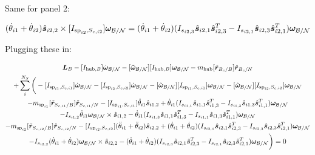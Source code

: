 \documentclass[paper]{aiaaNew}
\begin{document}
Same for panel 2:

\begin{equation}
(\dot{\theta}_{i1}  + \dot{\theta}_{i2})\hat{\bm s}_{i2,2} \times [I_{\text{sp}_{i2},S_{c,i2}}] \bm \omega_{\cal{B/N}} = (\dot{\theta}_{i1}  + \dot{\theta}_{i2}) (I_{s_{i2,3}} \hat{\bm s}_{i2,1} \hat{\bm s}_{i2,3}^T - I_{s_{i2,1}} \hat{\bm s}_{i2,3} \hat{\bm s}_{i2,1}^T) \bm \omega_{\cal{B/N}}
\end{equation}

Plugging these in:

\begin{multline}
\bm L_B -[I_{\text{hub},B}] \dot{\bm\omega}_{\cal B/N}  -[\bm{\tilde{\omega}}_{\cal B/N}] [I_{\text{hub},B}] \bm\omega_{\cal B/N} - m_{\text{hub}} [\tilde{{\bm r}}_{B_c/B}] \ddot{\bm r}_{B_c/N} \\
+ \sum\limits_{i}^{N_S}\bigg(-[I_{\text{sp}_{i1},S_{c,i1}}] \dot{\bm \omega}_{\cal{B/N}} -[I_{\text{sp}_{i2},S_{c,i2}}] \dot{\bm \omega}_{\cal{B/N}} -[\tilde{\bm \omega}_{\cal{B/N}}] [I_{\text{sp}_{i1},S_{c,i1}}] \bm \omega_{\cal{B/N}}-[\tilde{\bm \omega}_{\cal{B/N}}] [I_{\text{sp}_{i2},S_{c,i2}}] \bm \omega_{\cal{B/N}}\\
- m_{\text{sp}_{i1}} [\tilde{{\bm r}}_{S_{c,i1}/B}] \ddot{\bm r}_{S_{c,i1}/N} -[I_{\text{sp}_{i1},S_{c,i1}}] \ddot{\theta}_{i1} \hat{\bm s}_{i1,2} +\dot{\theta}_{i1} (I_{s_{i1,1}} \hat{\bm s}_{i1,1} \hat{\bm s}_{i1,3}^T - I_{s_{i1,3}} \hat{\bm s}_{i1,3} \hat{\bm s}_{i1,1}^T) \bm \omega_{\cal{B/N}}\\
-I_{s_{i1,2}} \dot{\theta}_{i1} \bm \omega_{\cal{B/N}} \times \hat{\bm s}_{i1,2} -\dot{\theta}_{i1} (I_{s_{i1,3}} \hat{\bm s}_{i1,1} \hat{\bm s}_{i1,3}^T - I_{s_{i1,1}} \hat{\bm s}_{i1,3} \hat{\bm s}_{i1,1}^T) \bm \omega_{\cal{B/N}}\\
- m_{\text{sp}_{i2}} [\tilde{{\bm r}}_{S_{c,i2}/B}] \ddot{\bm r}_{S_{c,i2}/N} -[I_{\text{sp}_{i2},S_{c,i2}}] (\ddot{\theta}_{i1}  + \ddot{\theta}_{i2})\hat{\bm s}_{i2,2} +(\dot{\theta}_{i1}  + \dot{\theta}_{i2}) (I_{s_{i2,1}} \hat{\bm s}_{i2,1} \hat{\bm s}_{i2,3}^T - I_{s_{i2,3}} \hat{\bm s}_{i2,3} \hat{\bm s}_{i2,1}^T) \bm \omega_{\cal{B/N}} \\
-I_{s_{i2,2}}  (\dot{\theta}_{i1}  + \dot{\theta}_{i2}) \bm \omega_{\cal{B/N}} \times \hat{\bm s}_{i2,2} -(\dot{\theta}_{i1}  + \dot{\theta}_{i2}) (I_{s_{i2,3}} \hat{\bm s}_{i2,1} \hat{\bm s}_{i2,3}^T - I_{s_{i2,1}} \hat{\bm s}_{i2,3} \hat{\bm s}_{i2,1}^T) \bm \omega_{\cal{B/N}}\bigg) = 0
\end{multline}
\end{document}
